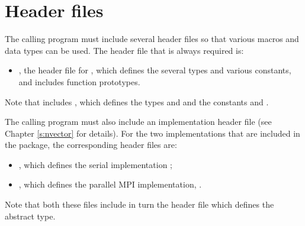 \section{Header files}\label{ss:header_sim}
The calling program must include several header files so that various macros
and data types can be used. The header file that is always required is:
\begin{itemize}
\item  {}, 
  the header file for {\cvode}, which defines the several
  types and various constants, and includes function prototypes.
\end{itemize}
Note that  includes , 
which defines the types  and 
and the constants  and .

The calling program must also include an {\nvector} implementation header file
(see Chapter \ref{s:nvector} for details).
For the two {\nvector} implementations that are included in the {\cvode} package,
the corresponding header files are:
\begin{itemize}
\item {}, 
  which defines the serial implementation {\nvecs};
\item {}, 
  which defines the parallel MPI implementation, {\nvecp}.
\end{itemize}
Note that both these files include in turn the header file  which 
defines the abstract  type. 

